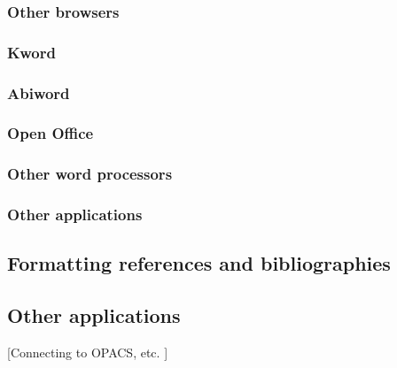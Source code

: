 \subsubsection{Other browsers}



\subsubsection{Kword}


\subsubsection{Abiword}


\subsubsection{Open Office}


\subsubsection{Other word processors}



\subsubsection{Other applications}



\subsection{Formatting references  and bibliographies}
\label{sec:formatting}


\subsection{Other applications}
\label{sec:applications}

[Connecting to OPACS, etc. ]


